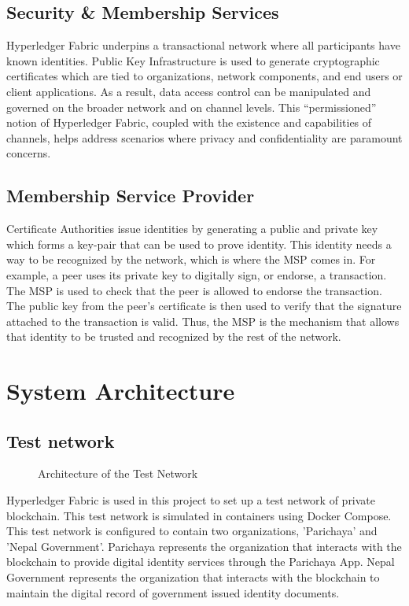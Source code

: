\subsection{Security \& Membership Services}
Hyperledger Fabric underpins a transactional network where all participants have known identities. Public Key Infrastructure is used to generate cryptographic certificates which are tied to organizations, network components, and end users or client applications. As a result, data access control can be manipulated and governed on the broader network and on channel levels. This “permissioned” notion of Hyperledger Fabric, coupled with the existence and capabilities of channels, helps address scenarios where privacy and confidentiality are paramount concerns.
\subsection{Membership Service Provider}
Certificate Authorities issue identities by generating a public and private key which forms a key-pair that can be used to prove identity. This identity needs a way to be recognized by the network, which is where the MSP comes in. For example, a peer uses its private key to digitally sign, or endorse, a transaction. The MSP is used to check that the peer is allowed to endorse the transaction. The public key from the peer’s certificate is then used to verify that the signature attached to the transaction is valid. Thus, the MSP is the mechanism that allows that identity to be trusted and recognized by the rest of the network.


\section{System Architecture}
\subsection{Test network} 
\vspace{10pt}
\begin{figure}[H]
\centerline{}
\caption{Architecture of the Test Network}
\label{fig: example}
\end{figure}
Hyperledger Fabric is used in this project to set up a test network of private blockchain. This test network is simulated in containers using Docker Compose. This test network is configured to contain two organizations, ’Parichaya’ and ’Nepal Government’. 
Parichaya represents the organization that interacts with the blockchain to provide digital identity services through the Parichaya App. Nepal Government represents the organization that interacts with the blockchain to maintain the digital record of government issued identity documents.

